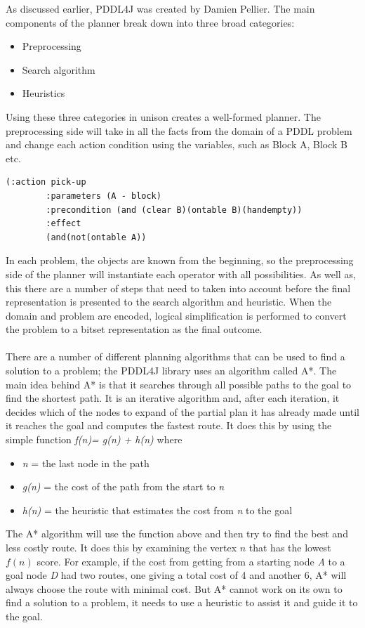 As discussed earlier, PDDL4J was created by Damien Pellier. The main components of the planner break down into three broad categories: 
\begin{itemize}
\item Preprocessing 
\item Search algorithm 
\item Heuristics
\end{itemize}
Using these three categories in unison creates a well-formed planner. The preprocessing side will take in all the facts from the domain of a PDDL problem and change each action condition using the variables, such as Block A, Block B etc. 
\begin{verbatim}
(:action pick-up
		:parameters (A - block) 
		:precondition (and (clear B)(ontable B)(handempty))
		:effect
		(and(not(ontable A)) 
\end{verbatim}
In each problem, the objects are known from the beginning, so the preprocessing side of the planner will instantiate each operator with all possibilities. As well as, this there are a number of steps that need to taken into account before the final representation is presented to the search algorithm and heuristic. When the domain and problem are encoded, logical simplification is performed to convert the problem to a bitset representation as the final outcome.
\\
\\
There are a number of different planning algorithms that can be used to find a solution to a problem; the PDDL4J library uses an algorithm called A*. The main idea behind A* is that it searches through all possible paths to the goal to find the shortest path. It is an iterative algorithm and, after each iteration, it decides which of the nodes to expand of the partial plan it has already made until it reaches the goal and computes the fastest route. It does this by using the simple function
\textit{f(n)= g(n) + h(n)} \cite{MinimumCostPaths} where
\begin{itemize}
\item\textit{n} = the last node in the path
\item\textit{g(n)} = the cost of the path from the start to \textit{n}
\item\textit{h(n)} = the heuristic that estimates the cost from \textit{n} to the goal
\end{itemize}

The A* algorithm will use the function above and then try to find the best and less costly route. It does this by examining the vertex $n$ that has the lowest $f(n)$ score. For example, if the cost from getting from a starting node \textit{A} to a goal node \textit{D} had two routes, one giving a total cost of 4 and another 6, A* will always choose the route with minimal cost. But A* cannot work on its own to find a solution to a problem, it needs to use a heuristic to assist it and guide it to the goal.

